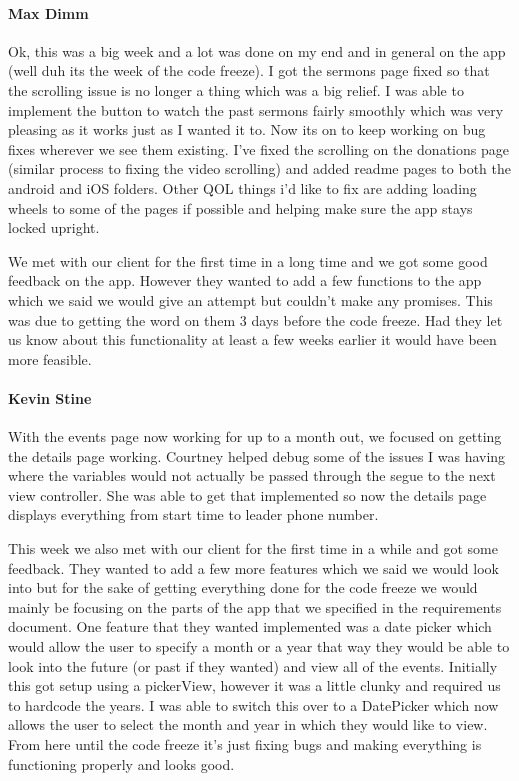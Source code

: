 			\paragraph{Max Dimm}
			Ok, this was a big week and a lot was done on my end and in general on the app (well duh its the week of the code freeze). I got the sermons page fixed so that the scrolling issue is no longer a thing which was a big relief. I was able to implement the button to watch the past sermons fairly smoothly which was very pleasing as it works just as I wanted it to. Now its on to keep working on bug fixes wherever we see them existing. I've fixed the scrolling on the donations page (similar process to fixing the video scrolling) and added readme pages to both the android and iOS folders. Other QOL things i'd like to fix are adding loading wheels to some of the pages if possible and helping make sure the app stays locked upright.

We met with our client for the first time in a long time and we got some good feedback on the app. However they wanted to add a few functions to the app which we said we would give an attempt but couldn't make any promises. This was due to getting the word on them 3 days before the code freeze. Had they let us know about this functionality at least a few weeks earlier it would have been more feasible.
			
			\paragraph{Kevin Stine}
			With the events page now working for up to a month out, we focused on getting the details page working. Courtney helped debug some of the issues I was having where the variables would not actually be passed through the segue to the next view controller. She was able to get that implemented so now the details page displays everything from start time to leader phone number.

This week we also met with our client for the first time in a while and got some feedback. They wanted to add a few more features which we said we would look into but for the sake of getting everything done for the code freeze we would mainly be focusing on the parts of the app that we specified in the requirements document. One feature that they wanted implemented was a date picker which would allow the user to specify a month or a year that way they would be able to look into the future (or past if they wanted) and view all of the events. Initially this got setup using a pickerView, however it was a little clunky and required us to hardcode the years. I was able to switch this over to a DatePicker which now allows the user to select the month and year in which they would like to view. From here until the code freeze it's just fixing bugs and making everything is functioning properly and looks good.
			
